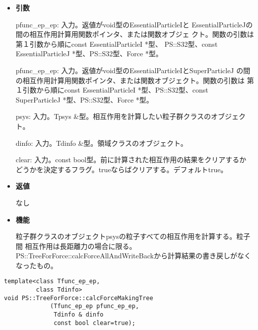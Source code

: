 \begin{itemize}

\item {\bf 引数}

pfunc\_ep\_ep: 入力。返値がvoid型のEssentialParticleIと
EssentialParticleJの間の相互作用計算用関数ポインタ、または関数オブジェ
クト。関数の引数は第１引数から順にconst EssentialParticleI *型、
PS::S32型、const EssentialParticleJ *型、PS::S32型、Force *型。

pfunc\_ep\_ep: 入力。返値がvoid型のEssentialParticleIとSuperParticleJ
の間の相互作用計算用関数ポインタ、または関数オブジェクト。関数の引数は
第１引数から順にconst EssentialParticleI *型、PS::S32型、const
SuperParticleJ *型、PS::S32型、Force *型。

psys: 入力。Tpsys \&型。相互作用を計算したい粒子群クラスのオブジェクト。

dinfo: 入力。Tdinfo \&型。領域クラスのオブジェクト。

clear: 入力。const bool型。前に計算された相互作用の結果をクリアするか
どうかを決定するフラグ。trueならばクリアする。デフォルトtrue。

\item {\bf 返値}

なし

\item {\bf 機能}

粒子群クラスのオブジェクトpsysの粒子すべての相互作用を計算する。粒子間
相互作用は長距離力の場合に限る。
PS::TreeForForce::calcForceAllAndWriteBackから計算結果の書き戻しがなく
なったもの。

\end{itemize}


\begin{screen}
\begin{verbatim}
template<class Tfunc_ep_ep,
         class Tdinfo>
void PS::TreeForForce::calcForceMakingTree
             (Tfunc_ep_ep pfunc_ep_ep,
              Tdinfo & dinfo
              const bool clear=true);
\end{verbatim}
\end{screen}


